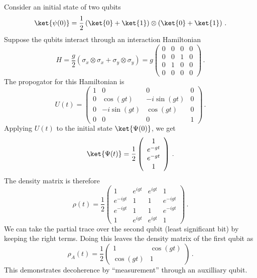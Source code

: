 Consider an initial state of two qubits
\begin{equation}
  \ket{\psi(0)} = \frac{1}{2}
    \left( \ket{0} + \ket{1} \right) \otimes
    \left( \ket{0} + \ket{1} \right)\, .
\end{equation}
Suppose the qubits interact through an interaction Hamiltonian
\begin{equation}
  H = \frac{g}{2} \left( \sigma_x \otimes \sigma_x + \sigma_y \otimes \sigma_y \right)
    = g \left(
        \begin{array}{cccc}
          0 & 0 & 0 & 0 \\
          0 & 0 & 1 & 0 \\
          0 & 1 & 0 & 0 \\
          0 & 0 & 0 & 0
        \end{array}
      \right)
    \, .
\end{equation}
The propogator for this Hamiltonian is
\begin{equation}
U(t) =
  \left(
  \begin{array}{cccc}
    1 & 0 & 0 & 0 \\
    0 & \cos(gt) & -i \sin(gt) & 0 \\
    0 & -i \sin(gt) & \cos(gt) & 0 \\
    0 & 0 & 0 & 1
  \end{array}
  \right)
  \, .
\end{equation}
Applying $U(t)$ to the initial state $\ket{\Psi(0)}$, we get
\begin{equation}
  \ket{\Psi(t)} =
  \frac{1}{2}
  \left(
    \begin{array}{c}
      1 \\ e^{-gt} \\ e^{-gt} \\ 1
    \end{array}
  \right) \, .
\end{equation}
The density matrix is therefore
\begin{equation}
  \rho(t) = \frac{1}{2}
  \left(
  \begin{array}{cccc}
    1         & e^{igt}  & e^{igt}  & 1        \\
    e^{-igt}  & 1        & 1        & e^{-igt} \\
    e^{-igt}  & 1        & 1        & e^{-igt} \\
    1         & e^{igt}  & e^{igt}  & 1
  \end{array}
  \right) \, .
\end{equation}
We can take the partial trace over the second qubit (least significant bit) by keeping the right terms.
Doing this leaves the density matrix of the first qubit as
\begin{equation}
  \rho_A(t) =
  \frac{1}{2}
  \left(
    \begin{array}{cc}
      1        & \cos(gt) \\
      \cos(gt) & 1
    \end{array}
  \right)
  \, .
\end{equation}
This demonstrates decoherence by ``measurement'' through an auxilliary qubit.
